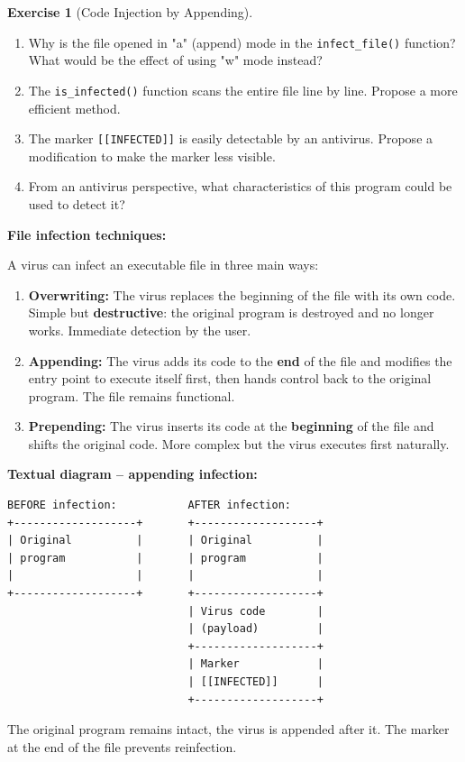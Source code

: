 \documentclass[a4paper,11pt]{article}
\theoremstyle{plain}
\theoremstyle{definition}
\newtheorem{exercice}{Exercise}
\begin{document}
\begin{exercice}[Code Injection by Appending]
\begin{enumerate}
\item Why is the file opened in "a" (append) mode in the \texttt{infect\_file()} function? What would be the effect of using "w" mode instead?

\item The \texttt{is\_infected()} function scans the entire file line by line. Propose a more efficient method.

\item The marker \texttt{[[INFECTED]]} is easily detectable by an antivirus. Propose a modification to make the marker less visible.

\item From an antivirus perspective, what characteristics of this program could be used to detect it?
\end{enumerate}

\end{exercice}

\begin{rappel}
\textbf{File infection techniques:}

A virus can infect an executable file in three main ways:

\begin{enumerate}
    \item \textbf{Overwriting:} The virus replaces the beginning of the file with its own code. Simple but \textbf{destructive}: the original program is destroyed and no longer works. Immediate detection by the user.

    \item \textbf{Appending:} The virus adds its code to the \textbf{end} of the file and modifies the entry point to execute itself first, then hands control back to the original program. The file remains functional.

    \item \textbf{Prepending:} The virus inserts its code at the \textbf{beginning} of the file and shifts the original code. More complex but the virus executes first naturally.
\end{enumerate}

\medskip
\textbf{Textual diagram -- appending infection:}

\begin{lstlisting}[numbers=none,frame=none,backgroundcolor=\color{white}]
BEFORE infection:           AFTER infection:
+-------------------+       +-------------------+
| Original          |       | Original          |
| program           |       | program           |
|                   |       |                   |
+-------------------+       +-------------------+
                            | Virus code        |
                            | (payload)         |
                            +-------------------+
                            | Marker            |
                            | [[INFECTED]]      |
                            +-------------------+
\end{lstlisting}

The original program remains intact, the virus is appended after it. The marker at the end of the file prevents reinfection.
\end{rappel}
\end{document}
